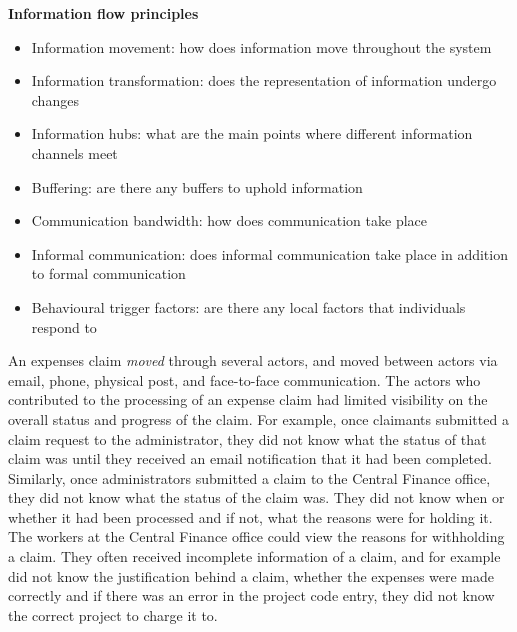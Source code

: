 \begin{framed}\noindent
\textbf{Information flow principles}
\begin{itemize}
\item Information movement: how does information move throughout the system
\item Information transformation: does the representation of information undergo changes
\item Information hubs: what are the main points where different information channels meet
\item Buffering: are there any buffers to uphold information
\item Communication bandwidth: how does communication take place
\item Informal communication: does informal communication take place in addition to formal communication
\item Behavioural trigger factors: are there any local factors that individuals respond to
\end{itemize}
\end{framed}

An expenses claim \textit{moved} through several actors, and moved between actors via email, phone, physical post, and face-to-face communication. The actors who contributed to the processing of an expense claim had limited visibility on the overall status and progress of the claim. For example, once claimants submitted a claim request to the administrator, they did not know what the status of that claim was until they received an email notification that it had been completed. Similarly, once administrators submitted a claim to the Central Finance office, they did not know what the status of the claim was. They did not know when or whether it had been processed and if not, what the reasons were for holding it. The workers at the Central Finance office could view the reasons for withholding a claim. They often received incomplete information of a claim, and for example did not know the justification behind a claim, whether the expenses were made correctly and if there was an error in the project code entry, they did not know the correct project to charge it to.

